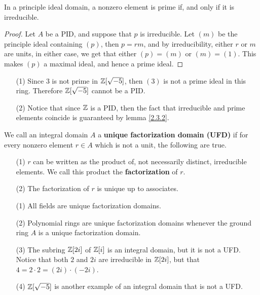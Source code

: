 \begin{lemma}\label{2.3.2}
    In a principle ideal domain, a nonzero element is prime if, and only if it
    is irreducible.
\end{lemma}
\begin{proof}
    Let $A$ be a PID, and suppose that $p$ is irreducible. Let $(m)$ be the
    principle ideal containing $(p)$, then $p=rm$, and by irreducibility, either
     $r$ or $m$ are units, in either case, we get that either $(p)=(m)$ or
     $(m)=(1)$. This makes $(p)$ a maximal ideal, and hence a prime ideal.
\end{proof}

\begin{example}\label{2.7}
    \begin{enumerate}
        \item[(1)] Since $3$ is not prime in  $\mathbb{Z}[\sqrt{-5}]$, then $(3)$ is not
            a prime ideal in this ring. Therefore $\mathbb{Z}[\sqrt{-5}]$ cannot be a
            PID.

        \item[(2)] Notice that since $\mathbb{Z}$ is a PID, then the fact that
            irreducible and prime elements coincide is guaranteed by lemma
            \ref{2.3.2}.
    \end{enumerate}
\end{example}

\begin{definition}
    We call an integral domain $A$ a  \textbf{unique factorization domain (UFD)}
    if for every nonzero element $r \in A$ which is not a unit, the following
    are true.
    \begin{enumerate}
        \item[(1)] $r$ can be written as the product of, not necessarily distinct,
            irreducible elements. We call this product the
            \textbf{factorization} of $r$.

        \item[(2)] The factorization of $r$ is unique up to associates.
    \end{enumerate}
\end{definition}

\begin{example}\label{2.8}
    \begin{enumerate}
        \item[(1)] All fields are unique factorization domains.

        \item[(2)] Polynomial rings are unique factorization domains whenever
            the ground ring $A$ is a unique factorization domain.

        \item[(3)] The subring $\mathbb{Z}[2i]$ of $\mathbb{Z}[i]$ is an integral domain, but it
            is not a UFD. Notice that both $2$ and  $2i$ are irreducible in
            $\mathbb{Z}[2i]$, but that $4=2 \cdot 2=(2i) \cdot (-2i)$.

        \item[(4)] $\mathbb{Z}[\sqrt{-5}]$ is another example of an integral domain that
            is not a UFD.
    \end{enumerate}
\end{example}

